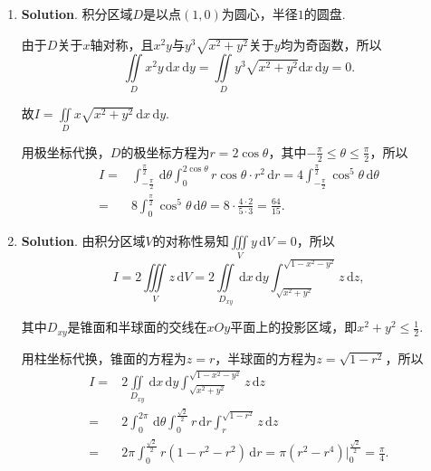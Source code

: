 \documentclass[../Main.tex]{subfiles}
\begin{document}
\begin{enumerate}
          由于$f(u,v)$二阶偏导数连续，所以$f''_{12}=f''_{21}$，整理得
          \[
              \frac{\partial^{2} z}{\partial x \partial y}= -\frac{1}{x^{2}}g'\left(\frac{y}{x}
              \right)-\frac{y}{x^{3}}g''\left(\frac{y}{x}\right)+f'_{1}-\frac{1}{y^{2}}
              f'_{2}+xyf''_{11}-\frac{x}{y^{3}}f''_{22}.
          \]

    \item \textbf{Solution}. 积分区域$D$是以点$(1,0)$为圆心，半径$1$的圆盘.

          由于$D$关于$x$轴对称，且$x^{2}y$与$y^{3}\sqrt{x^{2}+y^{2}}$关于$y$均为奇函数，所以
          \[
              \iint\limits_{D}x^{2} y\,\mathrm{d}x\,\mathrm{d}y=\iint\limits_{D}y^{3}\sqrt{x^{2}+y^{2}}
              \mathrm{d}x\,\mathrm{d}y=0.
          \]

          故$I=\iint\limits_{D}x\sqrt{x^{2}+y^{2}}\,\mathrm{d}x\,\mathrm{d}y$.

          用极坐标代换，$D$的极坐标方程为$r=2\cos \theta$，其中$-\frac{\pi}{2}\leq \theta
              \leq \frac{\pi}{2}$，所以
          \[
              \begin{aligned}
                  I = & \int_{-\frac{\pi}{2}}^{\frac{\pi}{2}}\,\mathrm{d}\theta\int_{0}^{2\cos\theta}r\cos\theta\cdot r^{2}\,\mathrm{d}r = 4\int_{-\frac{\pi}{2}}^{\frac{\pi}{2}}\cos^{5}\theta\,\mathrm{d}\theta \\
                  =   & 8\int_{0}^{\frac{\pi}{2}}\cos^{5}\theta\,\mathrm{d}\theta = 8\cdot\frac{4\cdot2}{5\cdot3}=\frac{64}{15}.
              \end{aligned}
          \]

    \item \textbf{Solution}. 由积分区域$V$的对称性易知$\iiint\limits_{V}y\,\mathrm{d}
              V=0$，所以
          \[
              I = 2\iiint\limits_{V}z\,\mathrm{d}V = 2\iint\limits_{D_{xy}}\,\mathrm{d}x\,\mathrm{d}
              y\int_{\sqrt{x^{2}+y^{2}}}^{\sqrt{1-x^{2}-y^{2}}}z\,\mathrm{d}z,
          \]

          其中$D_{xy}$是锥面和半球面的交线在$xOy$平面上的投影区域，即$x^{2}+y^{2}\leq
              \frac{1}{2}$.

          用柱坐标代换，锥面的方程为$z=r$，半球面的方程为$z=\sqrt{1-r^{2}}$，所以
          \[
              \begin{aligned}
                  I = & 2\iint\limits_{D_{xy}}\,\mathrm{d}x\,\mathrm{d}y\int_{\sqrt{x^2+y^2}}^{\sqrt{1-x^2-y^2}}z\,\mathrm{d}z                          \\
                  =   & 2\int_{0}^{2\pi}\,\mathrm{d}\theta \int_{0}^{\frac{\sqrt{2}}{2}}r\,\mathrm{d}r\int_{r}^{\sqrt{1-r^2}}z\,\mathrm{d}z             \\
                  =   & 2\pi\int_{0}^{\frac{\sqrt{2}}{2}}r(1-r^{2}-r^{2})\,\mathrm{d}r = \pi(r^{2}-r^{4})\Bigg|_{0}^{\frac{\sqrt{2}}{2}}=\frac{\pi}{4}.
              \end{aligned}
          \]
\end{enumerate}
\end{document}
